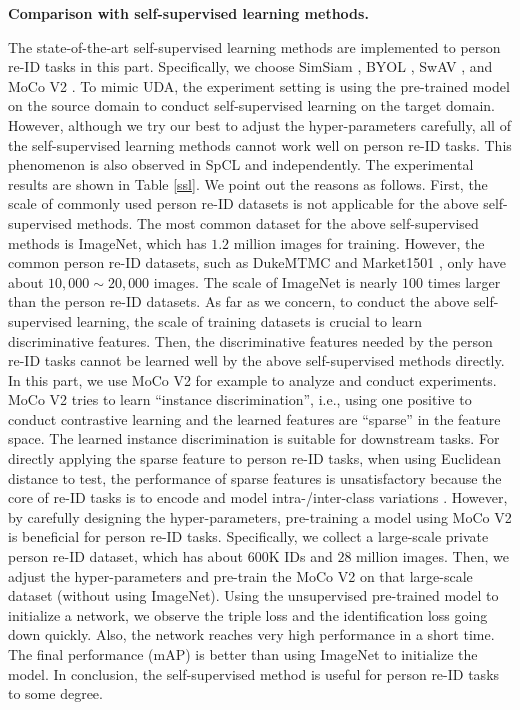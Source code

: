 \documentclass[journal]{IEEEtran}
\begin{document}
\textbf{Comparison with self-supervised learning methods.}\par 
The state-of-the-art self-supervised learning methods are implemented to person re-ID tasks in this part. Specifically, we choose SimSiam \cite{chen2021exploring}, BYOL \cite{NEURIPS2020_f3ada80d}, SwAV \cite{caron2020unsupervised}, and MoCo V2 \cite{he2020momentum}.  To mimic UDA, the experiment setting is using the pre-trained model on the source domain to conduct self-supervised learning on the target domain. However, although we try our best to adjust the hyper-parameters carefully, all of the self-supervised learning methods cannot work well on person re-ID tasks. This phenomenon is also observed in SpCL \cite{ge2020selfpaced} and \cite{DBLP:journals/corr/abs-2010-07608} independently.  The experimental results are shown in Table \ref{ssl}. We point out the reasons as follows. First, the scale of commonly used person re-ID datasets is not applicable for the above self-supervised methods. The most common dataset for the above self-supervised methods is ImageNet, which has $1.2$ million images for training. However, the common person re-ID datasets, such as DukeMTMC \cite{zheng2017unlabeled} and Market1501 \cite{zheng2015scalable}, only have about $10,000 \sim 20,000$ images. The scale of ImageNet is nearly $100$ times larger than the person re-ID datasets. As far as we concern, to conduct the above self-supervised learning, the scale of training datasets is crucial to learn discriminative features.  Then, the discriminative features needed by the person re-ID tasks cannot be learned well by the above self-supervised methods directly. In this part, we use MoCo V2 for example to analyze and conduct experiments. MoCo V2 tries to learn ``instance discrimination'', i.e., using one positive to conduct contrastive learning and the learned features are ``sparse'' in the feature space. The learned instance discrimination is suitable for downstream tasks. For directly applying the sparse feature to person re-ID tasks, when using Euclidean distance to test, the performance of sparse features is unsatisfactory because the core of re-ID tasks is to encode and model intra-/inter-class variations \cite{ge2020selfpaced}. However, by carefully designing the hyper-parameters, pre-training a model using MoCo V2  \cite{he2020momentum} is beneficial for person re-ID tasks. Specifically, we collect a large-scale private person re-ID dataset, which has about $600$K IDs and $28$ million images. Then, we adjust the hyper-parameters and pre-train the MoCo V2  \cite{he2020momentum}  on that large-scale dataset (without using ImageNet). Using the unsupervised pre-trained model to initialize a network, we observe the triple loss and the identification loss going down quickly. Also, the network reaches very high performance in a short time. The final performance (mAP) is better than using ImageNet to initialize the model. In conclusion, the self-supervised method is useful for person re-ID tasks to some degree.
\end{document}
